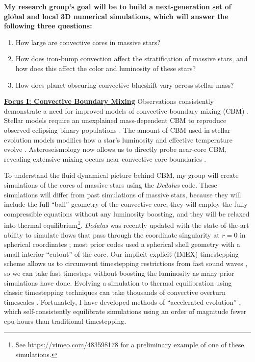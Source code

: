 \documentclass[12pt]{article}
\newcommand{\sct}[1]{\vspace{0.3cm}\hspace{-\parindent}\textbf{\underline{#1}}\hspace{0.3cm}}
\begin{document}
\textbf{My research group's goal will be to build a next-generation set of global and local 3D numerical simulations, which will answer the following three questions:}\vspace{-0.2cm}
\begin{enumerate}
    \item How large are convective cores in massive stars? \vspace{-0.2cm}
    \item How does iron-bump convection affect the stratification of massive stars, and how does this affect the color and luminosity of these stars?\vspace{-0.2cm}
    \item How does planet-obscuring convective blueshift vary across stellar mass?\vspace{-0.2cm}
\end{enumerate}

\sct{Focus I: Convective Boundary Mixing}
Observations consistently demonstrate a need for improved models of convective boundary mixing (CBM) \citep{johnston2021}.
Stellar models require an unexplained mass-dependent CBM to reproduce observed eclipsing binary populations  \citep{claret_torres_2019}.
The amount of CBM used in stellar evolution models modifies how a star's luminosity and effective temperature evolve \citep{castro_etal_2014,higgins_vink_2019}.
Asteroseismology now allows us to directly probe near-core CBM, revealing extensive mixing occurs near convective core boundaries \citep{michielsen_etal_2019, pedersen_etal_2021}.

To understand the fluid dynamical picture behind CBM, my group will create simulations of the cores of massive stars using the \emph{Dedalus} \citep{burns_etal_2020} code.
These simulations will differ from past simulations of massive stars, because they will include the full ``ball'' geometry of the convective core, they will employ the fully compressible equations without any luminosity boosting, and they will be relaxed into thermal equilibrium\footnote{See \url{https://vimeo.com/483598178} for a preliminary example of one of these simulations.}.
\emph{Dedalus} was recently updated with the state-of-the-art ability to simulate flows that pass through the coordinate singularity at $r = 0$ in spherical coordinates \citep{vasil_etal_2019,lecoanet_etal_2019}; most prior codes used a spherical shell geometry with a small interior ``cutout'' of the core.
Our implicit-explicit (IMEX) timestepping scheme allows us to circumvent timestepping restrictions from fast sound waves \citep{anders_brown_2017}, so we can take fast timesteps without boosting the luminosity as many prior simulations have done.
Evolving a simulation to thermal equilibration using classic timestepping techniques can take thousands of convective overturn timescales \citep{anders_etal_2022a,anders_etal_2022b}.
Fortunately, I have developed methods of ``accelerated evolution'' \citep{anders_etal_2018}, which self-consistently equilibrate simulations using an order of magnitude fewer cpu-hours than traditional timestepping.
\end{document}
